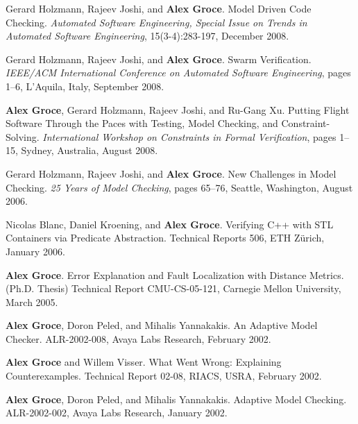 \documentclass[ComputerScience]{vita}
\begin{document}
\begin{vita}
\begin{Invited Papers}

\item Gerard Holzmann, Rajeev Joshi, and {\bf Alex Groce}.
\newblock Model Driven Code Checking.
\newblock \emph{Automated Software Engineering, Special Issue on Trends in Automated Software Engineering}, 15(3-4):283-197, December 2008.

\item Gerard Holzmann, Rajeev Joshi, and {\bf Alex Groce}.
\newblock Swarm Verification.
\newblock \emph{IEEE/ACM International Conference on Automated Software Engineering}, pages 1--6, L'Aquila, Italy, September 2008.

\item {\bf Alex Groce}, Gerard Holzmann, Rajeev Joshi, and Ru-Gang Xu.
\newblock Putting Flight Software Through the Paces with Testing, Model Checking, and Constraint-Solving.
\newblock \emph{International Workshop on Constraints in Formal Verification}, pages 1--15, Sydney, Australia, August 2008.

\item
Gerard Holzmann, Rajeev Joshi, and {\bf Alex Groce}.
\newblock New Challenges in Model Checking.
\newblock \emph
{25 Years of Model Checking}, pages 65--76, Seattle, Washington, August 2006.
\end{Invited Papers}

\begin{Technical Reports}
\item
Nicolas Blanc, Daniel Kroening, and {\bf Alex Groce}.
\newblock Verifying C++ with STL Containers via Predicate Abstraction.
\newblock Technical Reports 506, ETH Z\"urich, January 2006.

\item
{\bf Alex Groce}.
\newblock Error Explanation and Fault Localization with Distance Metrics.
\newblock (Ph.D. Thesis) Technical Report CMU-CS-05-121, Carnegie Mellon University, March 2005.

\item
{\bf Alex Groce}, Doron Peled, and Mihalis Yannakakis.
 An Adaptive Model Checker.
\newblock ALR-2002-008, Avaya Labs Research, February 2002.

\item
{\bf Alex Groce} and Willem Visser.
\newblock What Went Wrong: Explaining Counterexamples.
\newblock Technical Report 02-08, RIACS, USRA, February 2002.

\item
{\bf Alex Groce}, Doron Peled, and Mihalis Yannakakis.
\newblock Adaptive Model Checking.
\newblock ALR-2002-002, Avaya Labs Research, January 2002.


\end{Technical Reports}
\end{vita}
\end{document}
